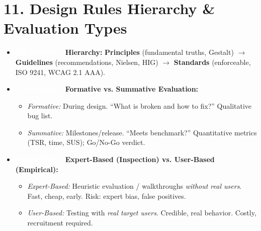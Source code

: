 \documentclass[8.5pt,a4paper,twocolumn]{article}
\newcommand{\tagmem}{\colorbox{accentred}{\textcolor{white}{\bfseries\fontsize{5.5pt}{6.5pt}\selectfont MEMORIZE}}\ }
\begin{document}
\section*{11. Design Rules Hierarchy \& Evaluation Types}
\begin{itemize}[leftmargin=7pt, itemsep=1pt, topsep=0.5pt]
    \item \tagmem \textbf{Hierarchy:} \textbf{Principles} (fundamental truths, Gestalt) $\rightarrow$ \textbf{Guidelines} (recommendations, Nielsen, HIG) $\rightarrow$ \textbf{Standards} (enforceable, ISO 9241, WCAG 2.1 AAA).
    \item \tagmem \textbf{Formative vs. Summative Evaluation:}
    \begin{itemize}[leftmargin=6pt, itemsep=0.5pt]
        \item \textit{Formative:} During design. ``What is broken and how to fix?'' Qualitative bug list.
        \item \textit{Summative:} Milestones/release. ``Meets benchmark?'' Quantitative metrics (TSR, time, SUS); Go/No-Go verdict.
    \end{itemize}
    \item \tagmem \textbf{Expert-Based (Inspection) vs. User-Based (Empirical):}
    \begin{itemize}[leftmargin=6pt, itemsep=0.5pt]
        \item \textit{Expert-Based:} Heuristic evaluation / walkthroughs \textit{without real users}. Fast, cheap, early. Risk: expert bias, false positives.
        \item \textit{User-Based:} Testing with \textit{real target users}. Credible, real behavior. Costly, recruitment required.
    \end{itemize}
\end{itemize}
\end{document}
